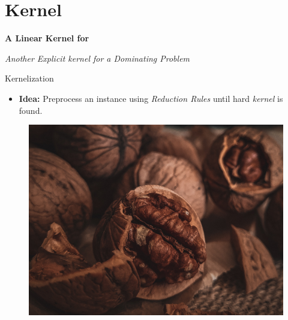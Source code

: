\section{Kernel}

\begin{frame}[c]{}
    \begin{center}
        \textbf{A Linear Kernel for \psdom}

        \textit{Another Explicit kernel for a Dominating Problem}
    \end{center}
\end{frame}

\begin{frame}[c]{Kernelization}
\begin{itemize}
    \item \textbf{Idea: } Preprocess an instance using \textit{Reduction Rules} until hard \textit{kernel} is found.
\end{itemize}

\begin{figure}
\centering
\resizebox{0.35\textwidth}{!} {
\includegraphics{fig/pexels-yulia-ilina-10400351.jpg}
}
\end{figure}
\end{frame}


